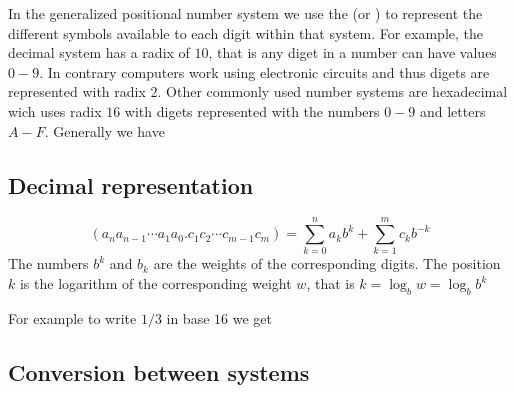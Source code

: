 \myindent In the generalized positional number system we use the  (or ) to represent the different symbols available to each digit within that system. For example, the decimal system has a radix of $10$, that is any diget in a number can have values $0-9$. In contrary computers work using electronic circuits and thus digets are represented with radix $2$. Other commonly used number systems are hexadecimal wich uses radix $16$ with digets represented with the numbers $0-9$ and letters $A-F$. Generally we have

\subsection{Decimal representation}
\[
(a_{n}a_{n-1} \cdots a_{1}a_{0} . c_{1}c_{2} \cdots c_{m-1}c_{m}) = 
    \sum_{k=0}^{n}a_{k}b^{k} + \sum_{k=1}^{m}c_{k}b^{-k}
\]
The numbers $b^{k}$ and $b_{k}$ are the weights of the corresponding digits. The position $k$ is the logarithm of the corresponding weight $w$, that is $k = \log_{b} w = \log_{b} b^k$ 

For example to write $1/3$ in base $16$ we get 

\subsection{Conversion between systems}


